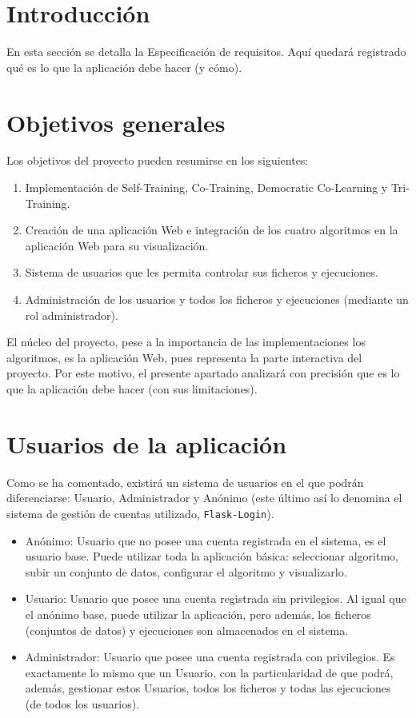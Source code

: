 
\section{Introducción}

En esta sección se detalla la Especificación de requisitos. Aquí quedará
registrado qué es lo que la aplicación debe hacer (y cómo).

\section{Objetivos generales}
Los objetivos del proyecto pueden resumirse en los siguientes:
\begin{enumerate}
    \item Implementación de Self-Training, Co-Training, Democratic Co-Learning y
    Tri-Training.
    \item Creación de una aplicación Web e integración de los cuatro algoritmos
    en la aplicación Web para su visualización.
    \item Sistema de usuarios que les permita controlar sus ficheros y
    ejecuciones.
    \item Administración de los usuarios y todos los ficheros y ejecuciones
    (mediante un rol administrador).
\end{enumerate}

El núcleo del proyecto, pese a la importancia de las implementaciones los
algoritmos, es la aplicación Web, pues representa la parte interactiva del
proyecto. Por este motivo, el presente apartado analizará con precisión que es
lo que la aplicación debe hacer (con sus limitaciones).

\section{Usuarios de la aplicación}

Como se ha comentado, existirá un sistema de usuarios en el que podrán
diferenciarse: Usuario, Administrador y Anónimo (este último así lo denomina el
sistema de gestión de cuentas utilizado, \texttt{Flask-Login}). 

\begin{itemize}
	\item Anónimo: Usuario que no posee una cuenta registrada en el sistema, es
	el usuario base. Puede utilizar toda la aplicación básica: seleccionar
	algoritmo, subir un conjunto de datos, configurar el algoritmo y
	visualizarlo.
	\item Usuario: Usuario que posee una cuenta registrada sin privilegios. Al
	igual que el anónimo base, puede utilizar la aplicación, pero además, los
	ficheros (conjuntos de datos) y ejecuciones son almacenados en el sistema.
	\item Administrador: Usuario que posee una cuenta registrada con
	privilegios. Es exactamente lo mismo que un Usuario, con la particularidad
	de que podrá, además, gestionar estos Usuarios, todos los ficheros y todas
	las ejecuciones (de todos los usuarios). 
\end{itemize}

